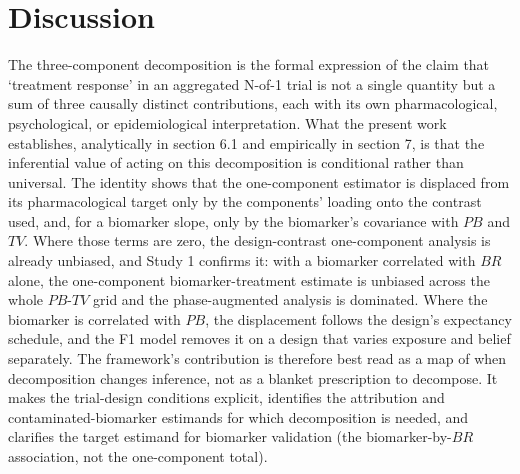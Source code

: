 \documentclass[
  11pt,
]{article}
\begin{document}
\section{Discussion}\label{discussion}

The three-component decomposition is the formal expression of the claim that
`treatment response' in an aggregated N-of-1 trial is not a single quantity
but a sum of three causally distinct contributions, each with its own
pharmacological, psychological, or epidemiological interpretation. What the
present work establishes, analytically in section 6.1 and empirically in
section 7, is that the inferential value of acting on this decomposition is
conditional rather than universal. The identity shows that the one-component
estimator is displaced from its pharmacological target only by the components'
loading onto the contrast used, and, for a biomarker slope, only by the
biomarker's covariance with \(PB\) and \(TV\). Where those terms are zero, the
design-contrast one-component analysis is already unbiased, and Study 1
confirms it: with a biomarker correlated with \(BR\) alone, the
one-component biomarker-treatment estimate is unbiased across the whole
\(PB\)-\(TV\) grid and the phase-augmented analysis is dominated. Where the
biomarker is correlated with \(PB\), the displacement follows the design's
expectancy schedule, and the F1 model removes it on a design that varies
exposure and belief separately. The framework's
contribution is therefore best read as a map of when decomposition changes
inference, not as a blanket prescription to decompose. It makes the
trial-design conditions explicit, identifies the attribution and
contaminated-biomarker estimands for which decomposition is needed, and
clarifies the target estimand for biomarker validation (the biomarker-by-\(BR\)
association, not the one-component total).
\end{document}
